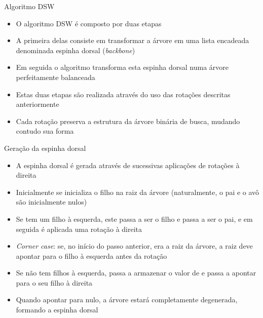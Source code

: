 \begin{frame}{Algoritmo DSW}

	\begin{itemize}
		\item O algoritmo DSW é composto por duas etapas

        \item A primeira delas consiste em {transformar} a árvore em uma lista encadeada 
            denominada {espinha dorsal} (\textit{backbone})

        \item Em seguida o algoritmo transforma esta espinha dorsal numa árvore {perfeitamente} 
            balanceada

		\item Estas duas etapas são realizada através do uso das {rotações} descritas anteriormente

        \item Cada rotação preserva a estrutura da árvore binária de busca, mudando contudo sua
            forma
	\end{itemize}

\end{frame}

\begin{frame}[fragile]{Geração da espinha dorsal}

    \begin{itemize}
        \item A espinha dorsal é gerada através de sucessivas aplicações de rotações à direita

        \item Inicialmente se inicializa o filho  na raiz da árvore 
            (naturalmente, o pai  e o avô  são inicialmente nulos)

        \item Se  tem um filho à esquerda, este passa a ser o filho e  passa
            a ser o pai, e em seguida é aplicada uma rotação à direita

        \item \textit{Corner case}: se, no início do passo anterior,  era a raiz da
            árvore, a raiz deve apontar para o filho à esquerda antes da rotação

        \item Se  não tem filhos à esquerda, 
             passa a armazenar o valor de  e 
            passa a apontar para o seu filho à direita

        \item Quando  apontar para nulo, a árvore estará completamente degenerada,
            formando a espinha dorsal
    \end{itemize}

\end{frame}

